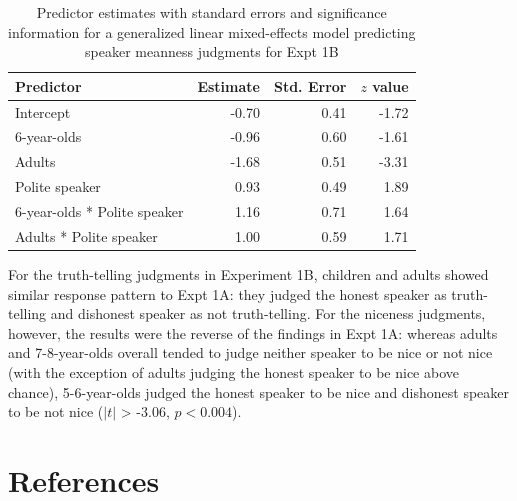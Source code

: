 \documentclass[a4paper,man,apacite,floatsintext]{apa6}
\begin{document}
\begin{table}[h]
\centering
\begin{tabular}{lrrr}
 Predictor & Estimate & Std. Error & $z$ value \\ 
  \hline
Intercept & -0.70 & 0.41 & -1.72 \\ 
  6-year-olds & -0.96 & 0.60 & -1.61 \\ 
  Adults & -1.68 & 0.51 & -3.31 \\ 
  Polite speaker & 0.93 & 0.49 & 1.89 \\ 
  6-year-olds * Polite speaker & 1.16 & 0.71 & 1.64 \\ 
  Adults * Polite speaker & 1.00 & 0.59 & 1.71 \\ 
   \hline
\end{tabular}
\caption{Predictor estimates with standard errors and significance information for a generalized linear mixed-effects model predicting speaker meanness judgments for Expt 1B} 
\label{tab:1b_mean_tab}
\end{table}

For the truth-telling judgments in Experiment 1B, children and adults
showed similar response pattern to Expt 1A: they judged the honest
speaker as truth-telling and dishonest speaker as not truth-telling. For
the niceness judgments, however, the results were the reverse of the
findings in Expt 1A: whereas adults and 7-8-year-olds overall tended to
judge neither speaker to be nice or not nice (with the exception of
adults judging the honest speaker to be nice above chance),
5-6-year-olds judged the honest speaker to be nice and dishonest speaker
to be not nice (\(|t|\) \textgreater{} -3.06, \(p <0.004\)).

\section{References}\label{references}


\end{document}
